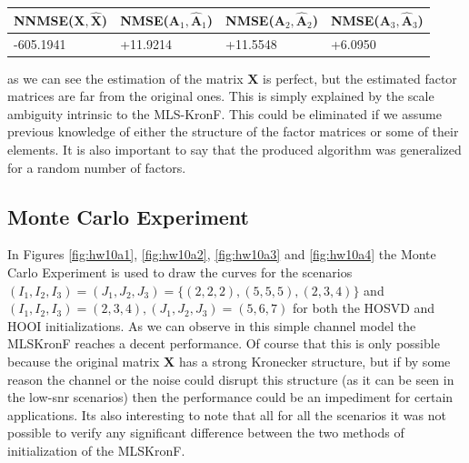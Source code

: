 \documentclass[a4paper,10pt]{article}
\begin{document}
    \begin{table}[ht!]
        \centering
        \begin{tabular}{|l|l|l|l|}
        \hline
        NNMSE($\boldsymbol{X}, \boldsymbol{\hat{X}}$) & NMSE($\boldsymbol{A}_{1}, \boldsymbol{\hat{A}}_{1}$) & NMSE($\boldsymbol{A}_{2}, \boldsymbol{\hat{A}}_{2}$) & NMSE($\boldsymbol{A}_{3}, \boldsymbol{\hat{A}}_{3}$) \\ \hline
        -605.1941 & +11.9214 & +11.5548 & +6.0950 \\ \hline
        \end{tabular}
    \end{table}

    as we can see the estimation of the matrix $\boldsymbol{X}$ is perfect, but the estimated factor matrices are far from the original ones. This is simply explained by 
    the scale ambiguity intrinsic to the MLS-KronF. This could be eliminated if we assume previous knowledge of either the structure of the factor matrices or some of their elements.
    It is also important to say that the produced algorithm was generalized for a random number of factors.

    \subsection*{Monte Carlo Experiment}

    In Figures \ref{fig:hw10a1}, \ref{fig:hw10a2}, \ref{fig:hw10a3} and \ref{fig:hw10a4} the Monte Carlo Experiment is used to draw the curves for the scenarios 
    $(I_{1},I_{2},I_{3}) = (J_{1},J_{2},J_{3}) = \{(2,2,2), (5,5,5), (2,3,4)\}$ and $(I_{1},I_{2},I_{3}) = (2,3,4), (J_{1},J_{2},J_{3}) = (5,6,7)$ for both the HOSVD and HOOI initializations. 
    As we can observe in  this simple channel model the MLSKronF reaches a decent performance. Of course that this is only possible because the original matrix $\boldsymbol{X}$ has a strong 
    Kronecker structure, but if by some reason the channel or the noise could disrupt this structure (as it can be seen in the low-snr scenarios) then the performance could be an impediment for certain applications.
    Its also interesting to note that all for all the scenarios it was not possible to verify any significant difference between the two methods of initialization of the MLSKronF.
\end{document}
